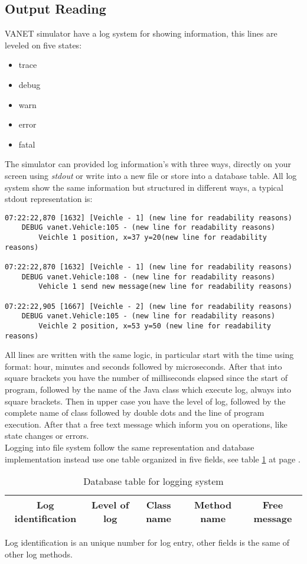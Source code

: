 \subsection{Output Reading}
VANET simulator have a log system for showing information, this lines are leveled on five states:
\begin{itemize}
	\item trace
	\item debug
	\item warn
	\item error
	\item fatal
\end{itemize}
The simulator can provided log  information's with three ways, directly on your screen using \textit{stdout} or write into a new file or store into a database table. All log system show the same information but structured in different ways, a typical stdout representation is:
\begin{verbatim}
07:22:22,870 [1632] [Veichle - 1] (new line for readability reasons)
	DEBUG vanet.Vehicle:105 - (new line for readability reasons)
		Veichle 1 position, x=37 y=20(new line for readability reasons)
		
07:22:22,870 [1632] [Veichle - 1] (new line for readability reasons)
	DEBUG vanet.Vehicle:108 - (new line for readability reasons)
		Vehicle 1 send new message(new line for readability reasons)
		
07:22:22,905 [1667] [Veichle - 2] (new line for readability reasons)
	DEBUG vanet.Vehicle:105 - (new line for readability reasons)
		Veichle 2 position, x=53 y=50 (new line for readability reasons)
\end{verbatim}
All lines are written with the same logic, in particular start with the time using format: hour, minutes and seconds followed by microseconds. After that into square brackets you have the number of milliseconds elapsed since the start of program, followed by the name of the Java class which execute log, always into square brackets. Then in upper case you have the level of log, followed by the complete name of class followed by double dots and the line of program execution. After that a free text message which inform you on operations, like state changes or errors.\\
Logging into file system follow the same representation and database implementation instead use one table organized in five fields, see table \ref{tab:DBLog} at page \pageref{tab:DBLog}.
\begin{table}[!ht]
	\centering
	\caption{Database table for logging system}
	\begin{tabular}{|c|c|c|c|c|}
	\hline\hline 
	\textbf{Log identification} & \textbf{Level of log} & \textbf{Class name} & \textbf{Method name} & \textbf{Free message}\\
	\hline
	\hline     %
 	\end{tabular} 
	\label{tab:DBLog}
\end{table}
Log identification is an unique number for log entry, other fields is the same of other log methods.
